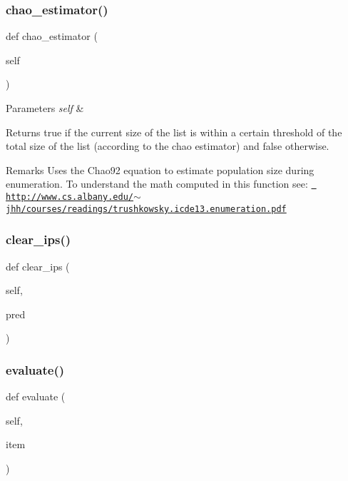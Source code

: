\subsubsection{\texorpdfstring{chao\_estimator()}{chao\_estimator()}}
{\footnotesize\ttfamily def chao\+\_\+estimator (\begin{DoxyParamCaption}\item[{}]{self }\end{DoxyParamCaption})}


\begin{DoxyParams}{Parameters}
{\em self} & \\
\hline
\end{DoxyParams}
\begin{DoxyReturn}{Returns}
true if the current size of the list is within a certain threshold of the total size of the list (according to the chao estimator) and false otherwise. 
\end{DoxyReturn}
\begin{DoxyRemark}{Remarks}
Uses the Chao92 equation to estimate population size during enumeration. To understand the math computed in this function see\+: \href{http://www.cs.albany.edu/~jhh/courses/readings/trushkowsky.icde13.enumeration.pdf}{\texttt{ http\+://www.\+cs.\+albany.\+edu/$\sim$jhh/courses/readings/trushkowsky.\+icde13.\+enumeration.\+pdf}} 
\end{DoxyRemark}
\mbox{\label{classdynamicfilterapp_1_1models_1_1_join_aaf3c24b85bb49707bf5b8ab6da21068c}} 
\subsubsection{\texorpdfstring{clear\_ips()}{clear\_ips()}}
{\footnotesize\ttfamily def clear\+\_\+ips (\begin{DoxyParamCaption}\item[{}]{self,  }\item[{}]{pred }\end{DoxyParamCaption})}

\mbox{\label{classdynamicfilterapp_1_1models_1_1_join_aced24bb06eb985f2929181e535212ffb}} 
\subsubsection{\texorpdfstring{evaluate()}{evaluate()}}
{\footnotesize\ttfamily def evaluate (\begin{DoxyParamCaption}\item[{}]{self,  }\item[{}]{item }\end{DoxyParamCaption})}


